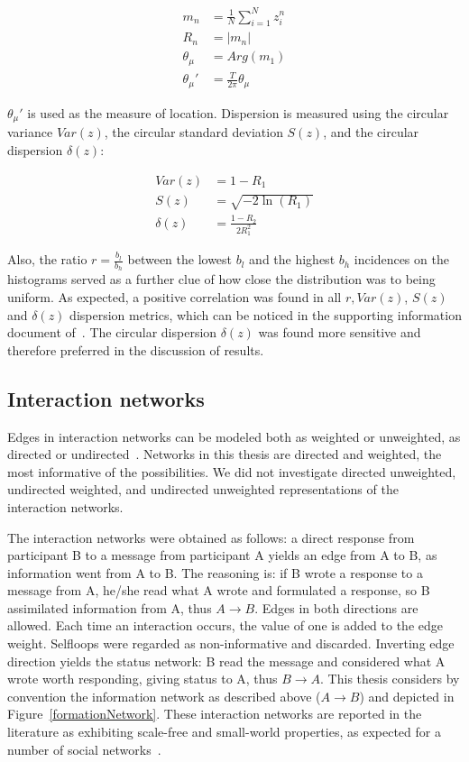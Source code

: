 \begin{align}\label{eq:cmom}
m_n&=\frac{1}{N}\sum_{i=1}^N z_i^n \nonumber\\
R_n&=|m_n|\\
\theta_\mu&=Arg(m_1) \nonumber \\
\theta_\mu'&=\frac{T}{2\pi} \theta_\mu \nonumber
\end{align}

$\theta_\mu'$ is used as the measure of location.
Dispersion is measured using the circular variance $Var(z)$,
the circular standard deviation $S(z)$, and the circular dispersion $\delta(z)$:

\begin{align}\label{eq:cmd}
Var(z)&=1 - R_1 \nonumber\\
S(z)&= \sqrt{-2\ln(R_1)}\\
\delta(z)&=\frac{1-R_2}{2 R_1^2} \nonumber
\end{align}

\noindent
Also, the ratio $r=\frac{b_l}{b_h}$ between the lowest $b_l$ and the highest $b_h$ incidences on the histograms 
served as a further clue of how close the distribution was to being uniform.
As expected, a positive correlation was found in all $r, Var(z)$, $S(z)$ and $\delta(z)$ dispersion metrics,
which can be noticed in the supporting information document of~\cite{stab}.
The circular dispersion $\delta(z)$ was found more sensitive and therefore preferred in the discussion of results.

\subsection{Interaction networks}\label{intNet}
Edges in interaction networks can be modeled both as weighted or unweighted, as directed or undirected~\cite{bird,newmanCommunityDirected,newmanCommunity2013}.
Networks in this thesis are directed and weighted, the most informative of the possibilities. We did not investigate directed unweighted, undirected weighted, and undirected unweighted representations of the interaction networks. 

The interaction networks were obtained as follows: a direct response from participant B to a message from participant A yields an edge from A to B, as information went from A to B. The reasoning is: if B wrote a response to a message from A, he/she read what A wrote and formulated a response, so B assimilated information from A, thus $A \rightarrow B$.
Edges in both directions are allowed. Each time an interaction occurs, the value of one is added to the edge weight. Selfloops were regarded as non-informative and discarded. Inverting edge direction yields the status network: B read the message and considered what A wrote worth responding, giving status to A, thus $B\rightarrow A$. This thesis considers by convention the information network as described above ($A\rightarrow B$) and depicted in Figure~\ref{formationNetwork}. These interaction networks are reported in the literature as exhibiting scale-free and small-world properties, as expected for a number of social networks~\cite{bird,newmanBook}.

